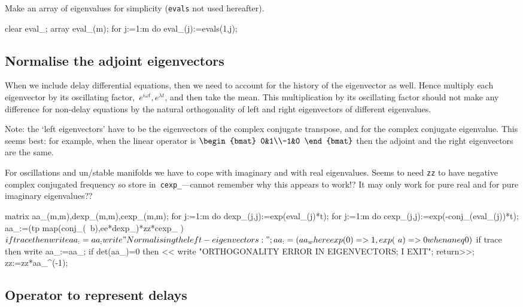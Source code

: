 \documentclass[11pt,a5paper]{article}
\begin{document}
Make an array of eigenvalues for simplicity (\verb|evals|
not used hereafter).
\begin{reduce}
clear eval_;  array eval_(m);
for j:=1:m do eval_(j):=evals(1,j);
\end{reduce}



\subsection{Normalise the adjoint eigenvectors}
When we include delay differential equations, then we need
to account for the history of the eigenvector as well. Hence
multiply each eigenvector by its oscillating
factor,~\(e^{i\omega t}, e^{\lambda t}\), and then take the
mean. This multiplication by its oscillating factor should
not make any difference for non-delay equations by the
natural orthogonality of left and right eigenvectors of
different eigenvalues. 

Note: the `left eigenvectors' have to be the eigenvectors of
the complex conjugate transpose, and for the complex
conjugate eigenvalue. This seems best: for example, when the
linear operator is \(\begin{bmat} 0&1\\-1&0 \end{bmat}\)
then the adjoint and the right eigenvectors are the same.

For oscillations and un/stable manifolds we have to cope
with imaginary and with real eigenvalues. Seems to need
\verb|zz| to have negative complex conjugated frequency so
store in~\verb|cexp_|---cannot remember why this appears to
work!?  It may only work for pure real and for pure
imaginary eigenvalues??

\begin{reduce}
matrix aa_(m,m),dexp_(m,m),cexp_(m,m);
for j:=1:m do dexp_(j,j):=exp(eval_(j)*t);
for j:=1:m do cexp_(j,j):=exp(-conj_(eval_(j))*t); 
aa_:=(tp map(conj_(~b),ee*dexp_)*zz*cexp_ )$
if trace then write aa_:=aa_;
write "Normalising the left-eigenvectors:";
aa_:=(aa_ where {exp(0)=>1, exp(~a)=>0 when a neq 0})$
if trace then write aa_:=aa_;
if det(aa_)=0 then << write
    "ORTHOGONALITY ERROR IN EIGENVECTORS; I EXIT"; 
    return>>;
zz:=zz*aa_^(-1);
\end{reduce}


\subsection{Operator to represent delays}
\end{document}
